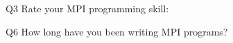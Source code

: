 \begin{description}%
\item{Q3} Rate your MPI programming skill:%
\item{Q6} How long have you been writing MPI programs?%
\end{description}%
